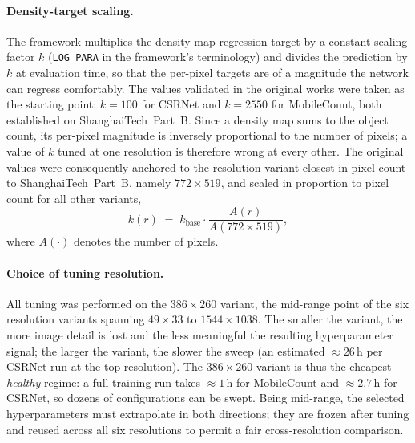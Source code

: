 \documentclass[conference]{IEEEtran}
\begin{document}
\paragraph{Density-target scaling.}
The framework multiplies the density-map regression target by a
constant scaling factor $k$ (\texttt{LOG\_PARA} in the framework's
terminology) and divides the prediction by $k$ at evaluation time, so
that the per-pixel targets are of a magnitude the network can regress
comfortably. The values validated in the original works were taken as the starting point:
$k=100$ for CSRNet and $k=2550$ for MobileCount, both established on
ShanghaiTech~Part~B. Since a density map sums to the object count, its
per-pixel magnitude is inversely proportional to the number of pixels;
a value of $k$ tuned at one resolution is therefore wrong at every
other. The original values were consequently anchored to the resolution
variant closest in pixel count to ShanghaiTech~Part~B, namely
$772\times519$, and scaled in proportion to pixel count for all other variants,
\begin{equation}
    k(r) \;=\; k_{\mathrm{base}}\cdot
    \frac{A(r)}{A(772\times519)},
    \label{eq:logpara_scaling}
\end{equation}
where $A(\cdot)$ denotes the number of pixels.

\paragraph{Choice of tuning resolution.}
All tuning was performed on the $386\times260$ variant, the mid-range point of the six resolution variants spanning $49\times33$ to $1544\times1038$. The smaller the variant, the more image detail is lost and the less meaningful the resulting hyperparameter signal; the larger the variant, the slower the sweep (an estimated ${\approx}26$\,h per CSRNet run at the top resolution). The $386\times260$ variant is thus the cheapest \emph{healthy} regime: a full training run takes ${\approx}1$\,h for MobileCount and ${\approx}2.7$\,h for CSRNet, so dozens of configurations can be swept. Being mid-range, the selected hyperparameters must extrapolate in both directions; they are frozen after tuning and reused across all six resolutions to permit a fair cross-resolution comparison.
\end{document}
